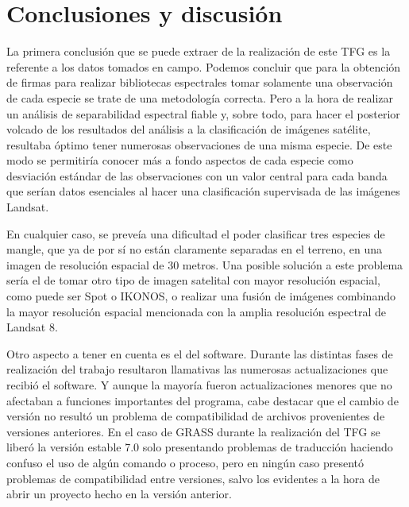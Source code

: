 


\chapter{Conclusiones y discusión}

La primera conclusión que se puede extraer de la realización de este \ac{TFG} es la referente a los datos tomados en campo. Podemos concluir que para la obtención de firmas para realizar bibliotecas espectrales tomar solamente una observación de cada especie se trate de una metodología correcta. Pero a la hora de realizar un análisis de separabilidad espectral fiable y, sobre todo, para hacer el posterior volcado de los resultados del análisis a la clasificación de imágenes satélite, resultaba óptimo tener numerosas observaciones de una misma especie. De este modo se permitiría conocer más a fondo aspectos de cada especie como desviación estándar de las observaciones con un valor central para cada banda que serían datos esenciales al hacer una clasificación supervisada de las imágenes Landsat.\Sep

En cualquier caso, se preveía una dificultad el poder clasificar tres especies de mangle, que ya de por sí no están claramente separadas en el terreno, en una imagen de resolución espacial de 30 metros. Una posible solución a este problema sería el de tomar otro tipo de imagen satelital con mayor resolución espacial, como puede ser Spot o IKONOS, o realizar una fusión de imágenes combinando la mayor resolución espacial mencionada con la amplia resolución espectral de Landsat 8.\Sep

Otro aspecto a tener en cuenta es el del software. Durante las distintas fases de realización del trabajo resultaron llamativas las numerosas actualizaciones que recibió el software. Y aunque la mayoría fueron actualizaciones menores que no afectaban a funciones importantes del programa, cabe destacar que el cambio de versión no resultó un problema de compatibilidad de archivos provenientes de versiones anteriores. En el caso de GRASS durante la realización del \ac{TFG} se liberó la versión estable 7.0 solo presentando problemas de traducción haciendo confuso el uso de algún comando o proceso, pero en ningún caso presentó problemas de compatibilidad entre versiones, salvo los evidentes a la hora de abrir un proyecto hecho en la versión anterior.\Sep

